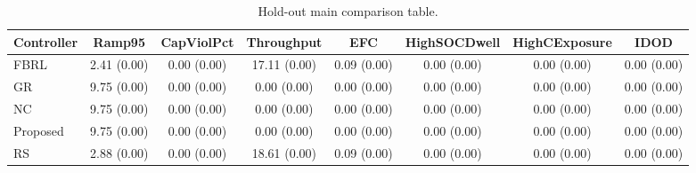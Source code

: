 \begin{table}[t]
\centering
\caption{Hold-out main comparison table.}
\label{tab:holdout_main_auto}
\begin{tabular}{lccccccc}
\toprule
Controller & Ramp95 & CapViolPct & Throughput & EFC & HighSOCDwell & HighCExposure & IDOD \\
\midrule
FBRL & 2.41 (0.00) & 0.00 (0.00) & 17.11 (0.00) & 0.09 (0.00) & 0.00 (0.00) & 0.00 (0.00) & 0.00 (0.00) \\
GR & 9.75 (0.00) & 0.00 (0.00) & 0.00 (0.00) & 0.00 (0.00) & 0.00 (0.00) & 0.00 (0.00) & 0.00 (0.00) \\
NC & 9.75 (0.00) & 0.00 (0.00) & 0.00 (0.00) & 0.00 (0.00) & 0.00 (0.00) & 0.00 (0.00) & 0.00 (0.00) \\
Proposed & 9.75 (0.00) & 0.00 (0.00) & 0.00 (0.00) & 0.00 (0.00) & 0.00 (0.00) & 0.00 (0.00) & 0.00 (0.00) \\
RS & 2.88 (0.00) & 0.00 (0.00) & 18.61 (0.00) & 0.09 (0.00) & 0.00 (0.00) & 0.00 (0.00) & 0.00 (0.00) \\
\bottomrule
\end{tabular}
\end{table}